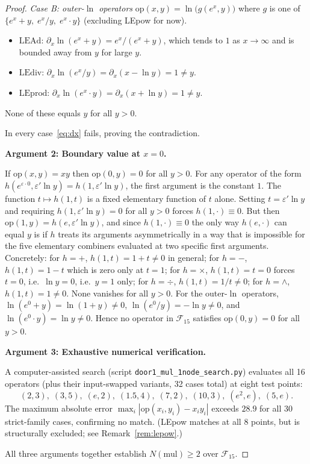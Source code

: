 \documentclass[11pt]{article}
\begin{document}
\begin{proof}
\emph{Case B: outer-$\ln$ operators} $\mathrm{op}(x,y)=\ln\!\bigl(g(e^x,y)\bigr)$
where $g$ is one of $\{e^x+y,\; e^x/y,\; e^x\cdot y\}$ (excluding LEpow for now).
\begin{itemize}
  \item $\mathrm{LEAd}$: $\partial_x \ln(e^x+y) = e^x/(e^x+y)$, which tends to $1$ as $x\to\infty$
        and is bounded away from $y$ for large $y$.
  \item $\mathrm{LEdiv}$: $\partial_x \ln(e^x/y) = \partial_x(x-\ln y) = 1 \neq y$.
  \item $\mathrm{LEprod}$: $\partial_x \ln(e^x\cdot y) = \partial_x(x+\ln y) = 1 \neq y$.
\end{itemize}
None of these equals $y$ for all $y>0$.

In every case~\eqref{eq:dx} fails, proving the contradiction.

\medskip
\noindent\textbf{Argument 2: Boundary value at $x=0$.}

If $\mathrm{op}(x,y)=xy$ then $\mathrm{op}(0,y)=0$ for all $y>0$.
For any operator of the form $h(e^{\varepsilon\cdot 0}, \varepsilon'\ln y)
= h(1, \varepsilon'\ln y)$, the first argument is the constant $1$.
The function $t\mapsto h(1,t)$ is a fixed elementary function of $t$ alone.
Setting $t=\varepsilon'\ln y$ and requiring $h(1, \varepsilon'\ln y)=0$ for all $y>0$
forces $h(1,\cdot)\equiv 0$.  But then $\mathrm{op}(1,y)=h(e,\varepsilon'\ln y)$,
and since $h(1,\cdot)\equiv 0$ the only way $h(e,\cdot)$ can equal $y$ is if
$h$ treats its arguments asymmetrically in a way that is impossible for the five
elementary combiners evaluated at two specific first arguments.
Concretely: for $h=+$, $h(1,t)=1+t\neq 0$ in general; for $h=-$, $h(1,t)=1-t$
which is zero only at $t=1$; for $h=\times$, $h(1,t)=t=0$ forces $t=0$, i.e.\
$\ln y=0$, i.e.\ $y=1$ only; for $h=\div$, $h(1,t)=1/t\neq 0$; for $h=\wedge$,
$h(1,t)=1\neq 0$.
None vanishes for all $y>0$.
For the outer-$\ln$ operators, $\ln(e^0+y)=\ln(1+y)\neq 0$,
$\ln(e^0/y)=-\ln y\neq 0$, and $\ln(e^0\cdot y)=\ln y\neq 0$.
Hence no operator in $\mathcal{F}_{15}$ satisfies $\mathrm{op}(0,y)=0$ for all $y>0$.

\medskip
\noindent\textbf{Argument 3: Exhaustive numerical verification.}

A computer-assisted search (script \texttt{door1\_mul\_1node\_search.py})
evaluates all 16 operators (plus their input-swapped variants, 32 cases total)
at eight test points:
\[
  (2,3),\;(3,5),\;(e,2),\;(1.5,4),\;(7,2),\;(10,3),\;(e^2,e),\;(5,e).
\]
The maximum absolute error $\max_i |\mathrm{op}(x_i,y_i)-x_iy_i|$ exceeds
$28.9$ for all 30 strict-family cases, confirming no match.
(LEpow matches at all 8 points, but is structurally excluded; see
Remark~\ref{rem:lepow}.)

All three arguments together establish $N(\mathrm{mul})\geq 2$ over $\mathcal{F}_{15}$.
\end{proof}
\end{document}
